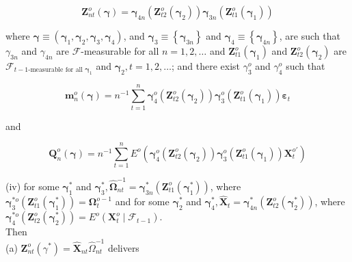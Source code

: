 \documentclass[10pt]{article}
\begin{document}
$$
\mathbf{Z}_{n t}^{o}(\boldsymbol{\gamma})=\boldsymbol{\gamma}_{4 n}\left(\mathbf{Z}_{t 2}^{o}\left(\boldsymbol{\gamma}_{2}\right)\right) \boldsymbol{\gamma}_{3 n}\left(\mathbf{Z}_{t 1}^{o}\left(\boldsymbol{\gamma}_{1}\right)\right)
$$

where $\boldsymbol{\gamma} \equiv\left(\boldsymbol{\gamma}_{1}, \boldsymbol{\gamma}_{2}, \boldsymbol{\gamma}_{3}, \boldsymbol{\gamma}_{4}\right)$, and $\boldsymbol{\gamma}_{3} \equiv\left\{\boldsymbol{\gamma}_{3 n}\right\}$ and $\boldsymbol{\gamma}_{4} \equiv\left\{\boldsymbol{\gamma}_{4 n}\right\}$, are such that $\gamma_{3 n}$ and $\gamma_{4 n}$ are $\mathcal{F}$-measurable for all $n=1,2, \ldots$ and $\mathbf{Z}_{t 1}^{o}\left(\boldsymbol{\gamma}_{1}\right)$ and $\mathbf{Z}_{t 2}^{o}\left(\boldsymbol{\gamma}_{2}\right)$ are $\mathcal{F}_{t-1 \text {-measurable for all } \boldsymbol{\gamma}_{1}}$ and $\boldsymbol{\gamma}_{2}, t=1,2, \ldots$; and there exist $\gamma_{3}^{o}$ and $\gamma_{4}^{o}$ such that

$$
\mathbf{m}_{n}^{o}(\boldsymbol{\gamma})=n^{-1} \sum_{t=1}^{n} \boldsymbol{\gamma}_{4}^{o}\left(\mathbf{Z}_{t 2}^{o}\left(\boldsymbol{\gamma}_{2}\right)\right) \boldsymbol{\gamma}_{3}^{o}\left(\mathbf{Z}_{t 1}^{o}\left(\boldsymbol{\gamma}_{1}\right)\right) \boldsymbol{\varepsilon}_{t}
$$

and

$$
\mathbf{Q}_{n}^{o}(\boldsymbol{\gamma})=n^{-1} \sum_{t=1}^{n} E^{o}\left(\boldsymbol{\gamma}_{4}^{o}\left(\mathbf{Z}_{t 2}^{o}\left(\boldsymbol{\gamma}_{2}\right)\right) \boldsymbol{\gamma}_{3}^{o}\left(\mathbf{Z}_{t 1}^{o}\left(\boldsymbol{\gamma}_{1}\right)\right) \mathbf{X}_{t}^{o \prime}\right)
$$

(iv) for some $\boldsymbol{\gamma}_{1}^{*}$ and $\boldsymbol{\gamma}_{3}^{*}, \hat{\boldsymbol{\Omega}}_{n t}^{-1}=\boldsymbol{\gamma}_{3 n}^{*}\left(\mathbf{Z}_{t 1}^{o}\left(\boldsymbol{\gamma}_{1}^{*}\right)\right)$, where $\boldsymbol{\gamma}_{3}^{* o}\left(\mathbf{Z}_{t 1}^{o}\left(\boldsymbol{\gamma}_{1}^{*}\right)\right)= \boldsymbol{\Omega}_{t}^{o-1}$ and for some $\boldsymbol{\gamma}_{2}^{*}$ and $\boldsymbol{\gamma}_{4}^{*}, \hat{\mathbf{X}}_{t}=\boldsymbol{\gamma}_{4 n}^{*}\left(\mathbf{Z}_{t 2}^{o}\left(\boldsymbol{\gamma}_{2}^{*}\right)\right)$, where $\boldsymbol{\gamma}_{4}^{* o}\left(\mathbf{Z}_{t 2}^{o}\left(\boldsymbol{\gamma}_{2}^{*}\right)\right) =E^{o}\left(\mathbf{X}_{t}^{o} \mid \mathcal{F}_{t-1}\right)$.\\
Then\\
(a) $\mathbf{Z}_{n t}^{o}\left(\gamma^{*}\right)=\hat{\mathbf{X}}_{n t} \hat{\Omega}_{n t}^{-1}$ delivers
\end{document}
